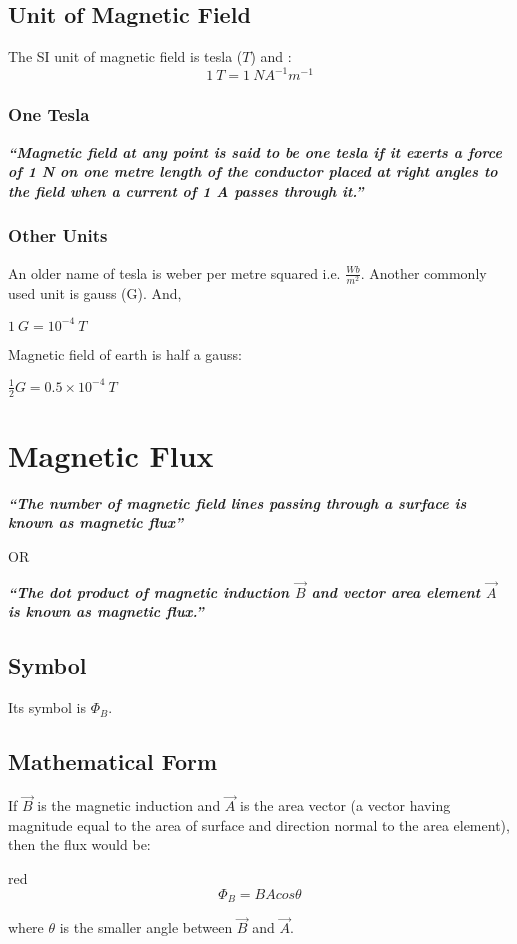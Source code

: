 \subsection*{Unit of Magnetic Field}
The SI unit of magnetic field  is tesla ($T$) and :
\begin{equation}
  1\:T = 1\:NA^{-1}m^{-1} 
\end{equation}

\subsubsection{One Tesla}
\textit{\textbf{“Magnetic field at any point is said to be one tesla if it exerts a force of 1 N on one metre length of the conductor placed at right angles to the field when a current of 1 A passes through it.”}}
\subsubsection{Other Units}
An older name of tesla is weber per metre squared i.e. $\frac{Wb}{m^{2}}$. Another commonly used unit is gauss (G).
And,
\begin{center}
    $1\:G = 10^{-4}\:T$
\end{center}
Magnetic field of earth is half a gauss:
\begin{center}
    $\frac{1}{2}G = 0.5 \times 10^{-4}\:T$
\end{center}
\section{Magnetic Flux}
\textit{\textbf{“The number of magnetic field lines passing through a surface
is known as magnetic flux”}}
\begin{center}
    OR
\end{center}
\textit{\textbf{“The dot product of magnetic induction $\vec{B}$ and vector
area element $\vec{A}$ is known as magnetic flux.”}}
\subsection{Symbol}
Its symbol is $\Phi_{B}$.

\subsection*{Mathematical Form}
If $\vec{B}$ is the magnetic induction and $\vec{A}$ is the area
vector (a vector having magnitude equal to the area of surface and
direction normal to the area element), then the flux would be:
\begin{mybox}{red}{}
\begin{equation}\label{eq:13.8}
  \Phi_{B} = BA cos\theta 
\end{equation}
\end{mybox}
where $\theta$ is the smaller angle between $\vec{B}$ and $\vec{A}$.
